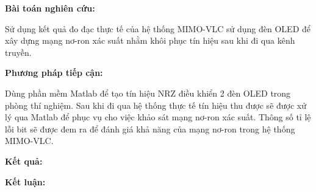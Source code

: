 \vspace{\baselineskip}
\textbf{Bài toán nghiên cứu:}

Sử dụng kết quả đo đạc thực tế của hệ thống MIMO-VLC sử dụng đèn OLED để xây dựng mạng nơ-ron xác suất nhằm khôi phục tín hiệu sau khi đi qua kênh truyền.

\vspace{\baselineskip}
\textbf{Phương pháp tiếp cận:}

Dùng phần mềm Matlab để tạo tín hiệu NRZ điều khiển 2 đèn OLED trong phòng thí nghiệm. Sau khi đi qua hệ thống thực tế tín hiệu thu được sẽ được xử lý qua Matlab để phục vụ cho việc khảo sát mạng nơ-ron xác suất. Thông số tỉ lệ lỗi bit sẽ được đem ra để đánh giá khả năng của mạng nơ-ron trong hệ thống MIMO-VLC. 

\vspace{\baselineskip}





\textbf{Kết quả:}

\vspace{\baselineskip}
\textbf{Kết luận:}



